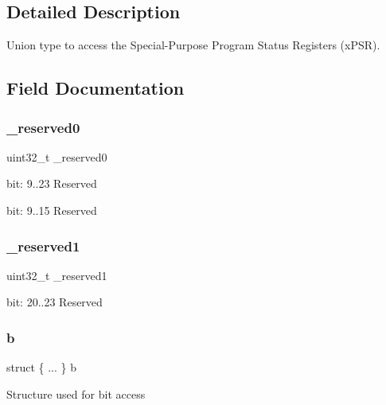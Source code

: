 \begin{DoxyCompactItemize}
\begin{tabbing}
\end{tabbing}\end{DoxyCompactItemize}


\subsection{Detailed Description}
Union type to access the Special-\/\+Purpose Program Status Registers (x\+P\+SR). 

\subsection{Field Documentation}
\mbox{\label{unionx_p_s_r___type_ac8a6a13838a897c8d0b8bc991bbaf7c1}} 
\subsubsection{\texorpdfstring{\_reserved0}{\_reserved0}}
{\footnotesize\ttfamily uint32\+\_\+t \+\_\+reserved0}

bit\+: 9..23 Reserved

bit\+: 9..15 Reserved \mbox{\label{unionx_p_s_r___type_a959a73d8faee56599b7e792a7c5a2d16}} 
\subsubsection{\texorpdfstring{\_reserved1}{\_reserved1}}
{\footnotesize\ttfamily uint32\+\_\+t \+\_\+reserved1}

bit\+: 20..23 Reserved \mbox{\label{unionx_p_s_r___type_a8d8c45d946ef8df11f4cac72c667e98b}} 
\subsubsection{\texorpdfstring{b}{b}\hspace{0.1cm}{\footnotesize\ttfamily [1/6]}}
{\footnotesize\ttfamily struct \{ ... \}   b}

Structure used for bit access \mbox{\label{unionx_p_s_r___type_a5443dc0839f42341fa2e2e52d9cf1ebb}} 
